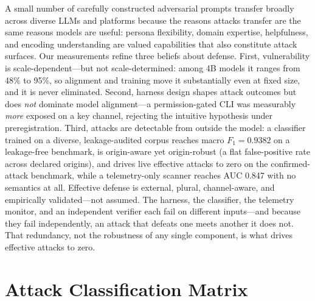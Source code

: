 \documentclass{article}
\begin{document}
A small number of carefully constructed adversarial prompts transfer broadly across diverse LLMs and platforms because the reasons attacks transfer are the same reasons models are useful: persona flexibility, domain expertise, helpfulness, and encoding understanding are valued capabilities that also constitute attack surfaces. Our measurements refine three beliefs about defense. First, vulnerability is scale-dependent---but not scale-determined: among 4B models it ranges from 48\% to 95\%, so alignment and training move it substantially even at fixed size, and it is never eliminated. Second, harness design shapes attack outcomes but does \emph{not} dominate model alignment---a permission-gated CLI was measurably \emph{more} exposed on a key channel, rejecting the intuitive hypothesis under preregistration. Third, attacks are detectable from outside the model: a classifier trained on a diverse, leakage-audited corpus reaches macro $F_1=0.9382$ on a leakage-free benchmark, is origin-aware yet origin-robust (a flat false-positive rate across declared origins), and drives live effective attacks to zero on the confirmed-attack benchmark, while a telemetry-only scanner reaches AUC 0.847 with no semantics at all. Effective defense is external, plural, channel-aware, and empirically validated---not assumed. The harness, the classifier, the telemetry monitor, and an independent verifier each fail on different inputs---and because they fail independently, an attack that defeats one meets another it does not. That redundancy, not the robustness of any single component, is what drives effective attacks to zero.





\newpage
\appendix

\section{Attack Classification Matrix}
\end{document}
